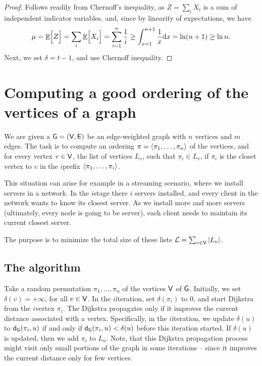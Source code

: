 \begin{proof}
    Follows readily from Chernoff's inequality, as $Z=\sum_i X_i$ is a
    sum of independent indicator variables, and, since by linearity of
    expectations, we have
    \begin{align*}
        \mu%
        =%
        \Ex{\Bigl. Z}%
        =%
        \sum_i \Ex{\Big. X_i}%
        =%
        \sum_{i=1}^n \frac{1}{i}%
        \geq%
        \int_{x=1}^{n+1} \frac{1}{x} \mathrm{d}x%
        =%
        \ln (n+1)%
        \geq%
        \ln n.
    \end{align*}
    Next, we set $\delta = t-1$, and use Chernoff inequality.
\end{proof}



\section{Computing a good ordering of the vertices %
   of a graph}

We are given a $\mathsf{G} = (\mathsf{V}, \mathsf{E})$ be an edge-weighted
graph with $n$ vertices and $m$ edges. The task is to compute an
ordering $\pi = \left\langle {\pi_1, \ldots, \pi_n} \right\rangle$ of the vertices, and
for every vertex $v \in \mathsf{V}$, the list of vertices $L_v$, such
that $\pi_i \in L_v$, if $\pi_i$ is the closet vertex to $v$ in the
$i$\th prefix $\left\langle {\pi_1,\ldots, \pi_i} \right\rangle$.  

This situation can arise for example in a streaming scenario, where we
install servers in a network. In the $i$\th stage there $i$ servers
installed, and every client in the network wants to know its closest
server. As we install more and more servers (ultimately, every node is
going to be server), each client needs to maintain its current closest
server.

The purpose is to minimize the total size of these lists
$\mathcal{L} = \sum_{v \in \mathsf{V}} \left| {L_v} \right|$.


\subsection{The algorithm}


Take a random permutation $\pi_1,\ldots, \pi_n$ of the vertices
$\mathsf{V}$ of $\mathsf{G}$.  Initially, we set $\delta(v) = +\infty$, for all
$v \in \mathsf{V}$.  In the $i$\th iteration, set $\delta(\pi_i)$ to $0$, and
start Dijkstra from the $i$\th vertex $\pi_i$.  The Dijkstra propagates
only if it improves the current distance associated with a
vertex. Specifically, in the $i$\th iteration, we update $\delta(u)$ to
$\distG{\pi_i}{u}$ if and only if $\distG{\pi_i}{u} < \delta(u)$ before this
iteration started. If $\delta(u)$ is updated, then we add $\pi_i$ to
$L_u$. Note, that this Dijkstra propagation process might visit only
small portions of the graph in some iterations -- since it improves the
current distance only for few vertices.

